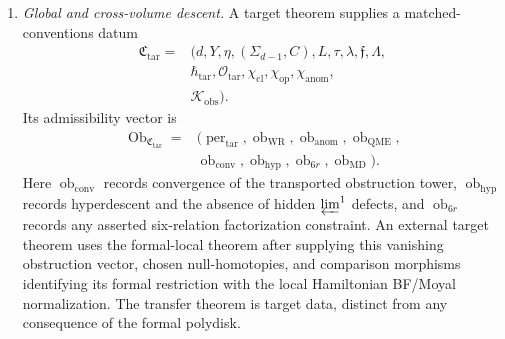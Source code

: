 \begin{enumerate}
  \item \emph{Global and cross-volume descent.}
  A target theorem supplies a matched-conventions datum
  \[
    \begin{aligned}
    \mathfrak C_{\mathrm{tar}}
    ={}&(d,Y,\eta,(\Sigma_{d-1},C),L,\tau,\lambda,\mathfrak f,\Lambda,\\
    &\hbar_{\mathrm{tar}},\mathcal O_{\mathrm{tar}},
      \chi_{\mathrm{cl}},\chi_{\mathrm{op}},\chi_{\mathrm{anom}},\\
    &\mathcal K_{\mathrm{obs}}).
    \end{aligned}
  \]
  Its admissibility vector is
  \[
    \begin{aligned}
    \operatorname{Ob}_{\mathfrak C_{\mathrm{tar}}}
    ={}&
    (\operatorname{per}_{\mathrm{tar}},
     \operatorname{ob}_{\mathrm{WR}},
     \operatorname{ob}_{\mathrm{anom}},
     \operatorname{ob}_{\mathrm{QME}},\\
    &\operatorname{ob}_{\mathrm{conv}},
     \operatorname{ob}_{\mathrm{hyp}},
     \operatorname{ob}_{6r},
     \operatorname{ob}_{\mathrm{MD}}).
    \end{aligned}
  \]
  Here \(\operatorname{ob}_{\mathrm{conv}}\) records convergence of the
  transported obstruction tower, \(\operatorname{ob}_{\mathrm{hyp}}\)
  records hyperdescent and the absence of hidden \(\varprojlim^1\)
  defects, and \(\operatorname{ob}_{6r}\) records any asserted
  six-relation factorization constraint.  An external target theorem
  uses the formal-local theorem after supplying this vanishing
  obstruction vector, chosen null-homotopies, and comparison morphisms
  identifying its formal restriction with the local Hamiltonian
  BF/Moyal normalization.  The transfer theorem is target data,
  distinct from any consequence of the formal polydisk.
\end{enumerate}
